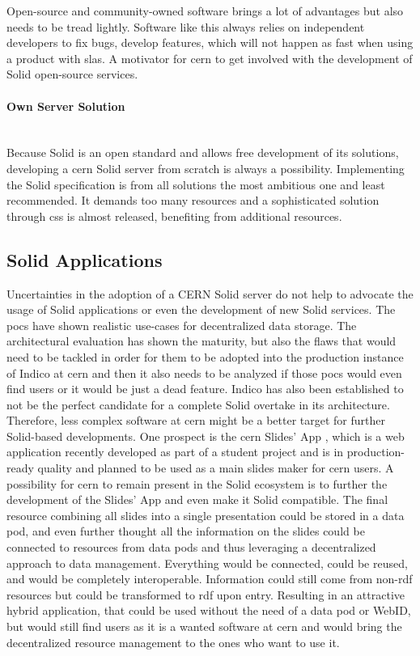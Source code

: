 Open-source and community-owned software brings a lot of advantages but also needs to be tread lightly. Software like this always relies on independent developers to fix bugs, develop features, which will not happen as fast when using a product with \glspl{sla}. A motivator for \gls{cern} to get involved with the development of Solid open-source services.
\vspace{0.5cm}
\paragraph{Own Server Solution}\mbox{}\\

Because Solid is an open standard and allows free development of its solutions, developing a \gls{cern} Solid server from scratch is always a possibility. Implementing the Solid specification is from all solutions the most ambitious one and least recommended. It demands too many resources and a sophisticated solution through \gls{css} is almost released, benefiting from additional resources.

\subsection{Solid Applications}

Uncertainties in the adoption of a CERN Solid server do not help to advocate the usage of Solid applications or even the development of new Solid services. The \glspl{poc} have shown realistic use-cases for decentralized data storage. The architectural evaluation has shown the maturity, but also the flaws that would need to be tackled in order for them to be adopted into the production instance of Indico at \gls{cern} and then it also needs to be analyzed if those \glspl{poc} would even find users or it would be just a dead feature. Indico has also been established to not be the perfect candidate for a complete Solid overtake in its architecture. Therefore, less complex software at \gls{cern} might be a better target for further Solid-based developments. One prospect is the \gls{cern} Slides' App \cite{cern-slides}, which is a web application recently developed as part of a student project and is in production-ready quality and planned to be used as a main slides maker for \gls{cern} users. A possibility for \gls{cern} to remain present in the Solid ecosystem is to further the development of the Slides' App and even make it Solid compatible. The final resource combining all slides into a single presentation could be stored in a data pod, and even further thought all the information on the slides could be connected to resources from data pods and thus leveraging a decentralized approach to data management. Everything would be connected, could be reused, and would be completely interoperable. Information could still come from non-\gls{rdf} resources but could be transformed to \gls{rdf} upon entry. Resulting in an attractive hybrid application, that could be used without the need of a data pod or WebID, but would still find users as it is a wanted software at \gls{cern} and would bring the decentralized resource management to the ones who want to use it.

